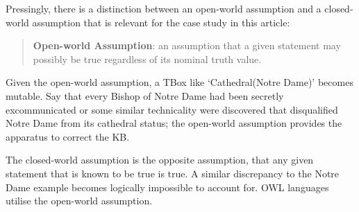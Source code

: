 \documentclass[titlepage,a4paper,12pt,oneside]{book}
\begin{document}
Pressingly, there is a distinction between an open-world assumption and a closed-world assumption that is relevant for the case study in this article:
\begin{quote}
\textbf{Open-world Assumption}: an assumption that a given statement may possibly be true regardless of its nominal truth value.
\end{quote}
Given the open-world assumption, a TBox like `Cathedral(Notre Dame)' becomes mutable.
Say that every Bishop of Notre Dame had been secretly excommunicated or some similar technicality were discovered that disqualified Notre Dame from its cathedral status; the open-world assumption provides the apparatus to correct the KB.\par
The closed-world assumption is the opposite assumption, that any given statement that is known to be true is true.
A similar discrepancy to the Notre Dame example becomes logically impossible to account for.
OWL languages utilise the open-world assumption.
\end{document}
